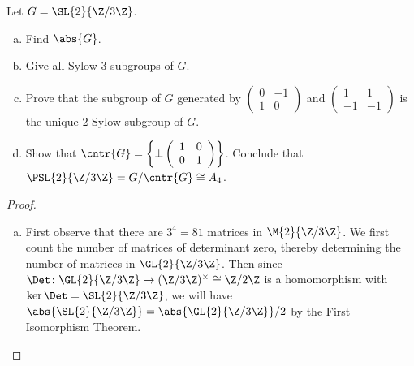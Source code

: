 \documentclass[10pt]{amsart}
\begin{document}
 \begin{thm}
   Let $G = \SL{2}{\Z/3\Z}$.
   \begin{enumerate}[(a)]
   \item
     Find $\abs{G}$.
   \item
     Give all Sylow 3-subgroups of $G$.
   \item
     Prove that the subgroup of $G$ generated by 
     $\left(\begin{array}{cc}
       0 & -1\\
       1 & 0
     \end{array}\right)$ and 
     $\left(\begin{array}{cc}
       1 & 1\\
       -1 & -1
     \end{array}\right)$ 
     is the unique 2-Sylow subgroup of $G$.
   \item
     Show that $\cntr{G} = \left\{\pm \left(\begin{array}{cc}
       1 & 0\\
       0 & 1\\
     \end{array}\right)\right\}$.
     Conclude that $\PSL{2}{\Z/3\Z} = G/\cntr{G} \cong A_4$.
   \end{enumerate}
   \begin{proof}
     \begin{enumerate}[(a)]
     \item
       First observe that there are $3^4 = 81$ matrices in $\M{2}{\Z/3\Z}$.
       We first count the number of matrices of determinant zero, thereby determining the number of matrices in $\GL{2}{\Z/3\Z}$.  
       Then since $\Det \colon \GL{2}{\Z/3\Z} \rightarrow (\Z/3\Z)^\times \cong \Z/2\Z$ is a homomorphism with $\ker\Det = \SL{2}{\Z/3\Z}$, we will have $\abs{\SL{2}{\Z/3\Z}} = \abs{\GL{2}{\Z/3\Z}}/2$ by the First Isomorphism Theorem.


\end{enumerate}
\end{proof}
\end{thm}
\end{document}
